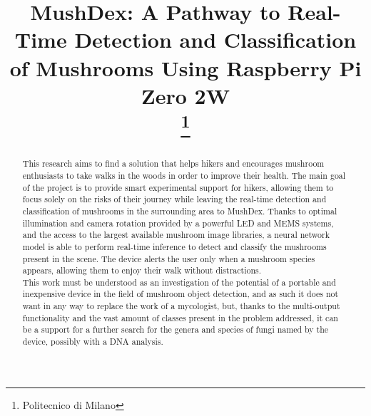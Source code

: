 \documentclass[conference]{IEEEtran}
\begin{document}
\title{MushDex: A Pathway to Real-Time Detection and Classification of Mushrooms Using Raspberry Pi Zero 2W\\
\thanks{Politecnico di Milano}
}

\author{
	\and
	\and
	
}

\maketitle

\begin{abstract}
This research aims to find a solution that helps hikers and encourages mushroom enthusiasts to take walks in the woods in order to improve their health. The main goal of the project is to provide smart experimental support for hikers, allowing them to focus solely on the risks of their journey while leaving the real-time detection and classification of mushrooms in the surrounding area to MushDex. Thanks to optimal illumination and camera rotation provided by a powerful LED and MEMS systems, and the access to the largest available mushroom image libraries, a neural network model is able to perform real-time inference to detect and classify the mushrooms present in the scene. The device alerts the user only when a mushroom species appears, allowing them to enjoy their walk without distractions.\\
This work must be understood as an investigation of the potential of a portable and inexpensive device in the field of mushroom object detection, and as such it does not want in any way to replace the work of a mycologist, but, thanks to the multi-output functionality and the vast amount of classes present in the problem addressed, it can be a support for a further search for the genera and species of fungi named by the device, possibly with a DNA analysis.
\end{abstract}
\end{document}
